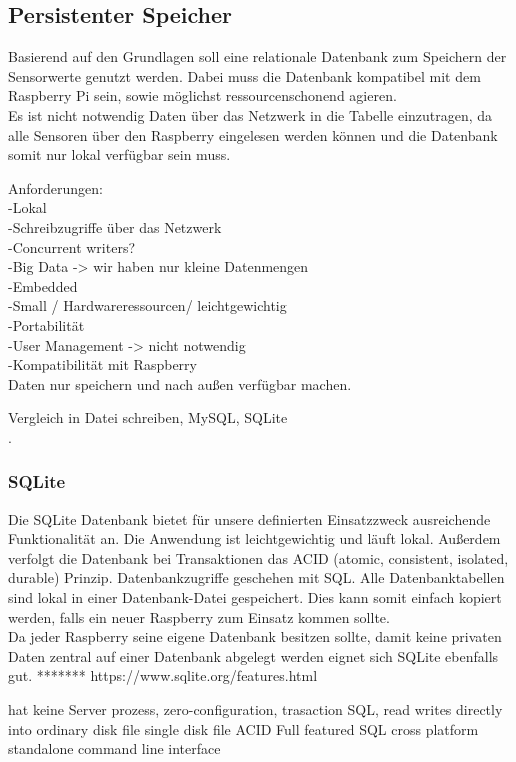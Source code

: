 \subsection{Persistenter Speicher}
Basierend auf den Grundlagen soll eine relationale Datenbank zum Speichern der Sensorwerte genutzt werden. Dabei muss die Datenbank kompatibel mit dem Raspberry Pi sein, sowie möglichst ressourcenschonend agieren. \\Es ist nicht notwendig Daten über das Netzwerk in die Tabelle einzutragen, da alle Sensoren über den Raspberry eingelesen werden können und die Datenbank somit nur lokal verfügbar sein muss.  

Anforderungen:\\
-Lokal \\
-Schreibzugriffe über das Netzwerk\\
-Concurrent writers?\\
-Big Data -> wir haben nur kleine Datenmengen\\
-Embedded\\
-Small / Hardwareressourcen/ leichtgewichtig\\
-Portabilität\\
-User Management -> nicht notwendig\\
-Kompatibilität mit Raspberry\\

Daten nur speichern und nach außen verfügbar machen.

Vergleich in Datei schreiben, MySQL, SQLite\\
.
\subsubsection{SQLite}
Die SQLite Datenbank bietet für unsere definierten Einsatzzweck ausreichende Funktionalität an. Die Anwendung ist leichtgewichtig und läuft lokal. Außerdem verfolgt die Datenbank bei Transaktionen das ACID (atomic, consistent, isolated, durable) Prinzip. Datenbankzugriffe geschehen mit SQL. Alle Datenbanktabellen sind lokal in einer Datenbank-Datei gespeichert. Dies kann somit einfach kopiert werden, falls ein neuer Raspberry zum Einsatz kommen sollte.\\
Da jeder Raspberry seine eigene Datenbank besitzen sollte, damit keine privaten Daten zentral auf einer Datenbank abgelegt werden eignet sich SQLite ebenfalls gut. 
*******
https://www.sqlite.org/features.html

hat keine Server prozess, zero-configuration, trasaction SQL, read writes directly into ordinary disk file
single disk file 
ACID
Full featured SQL
cross platform
standalone command line interface

